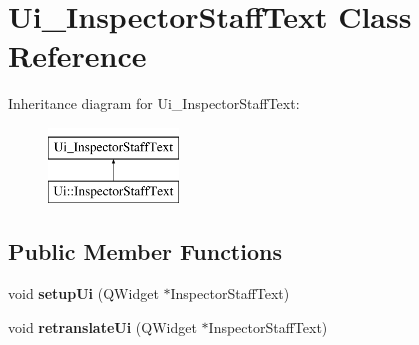 \hypertarget{class_ui___inspector_staff_text}{}\section{Ui\+\_\+\+Inspector\+Staff\+Text Class Reference}
\label{class_ui___inspector_staff_text}
Inheritance diagram for Ui\+\_\+\+Inspector\+Staff\+Text\+:\begin{figure}[H]
\begin{center}
\leavevmode
\includegraphics[height=2.000000cm]{class_ui___inspector_staff_text}
\end{center}
\end{figure}
\subsection*{Public Member Functions}
\begin{DoxyCompactItemize}
\item 
\mbox{\label{class_ui___inspector_staff_text_acaf7097a951897082c7e78d03798358a}} 
void {\bfseries setup\+Ui} (Q\+Widget $\ast$Inspector\+Staff\+Text)
\item 
\mbox{\label{class_ui___inspector_staff_text_a5f64455578a3c19f6e8908b78d8f2bb7}} 
void {\bfseries retranslate\+Ui} (Q\+Widget $\ast$Inspector\+Staff\+Text)
\end{DoxyCompactItemize}
